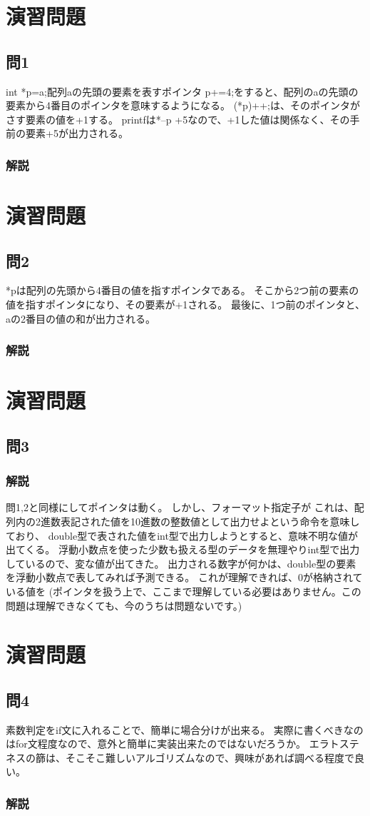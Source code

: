 \section{演習問題}
\subsection{問1}
int *p=a;配列aの先頭の要素を表すポインタ
p+=4;をすると、配列のaの先頭の要素から4番目のポインタを意味するようになる。
(*p)++;は、そのポインタがさす要素の値を+1する。
printfは*--p +5なので、+1した値は関係なく、その手前の要素+5が出力される。
\subsubsection{解説}

\section{演習問題}
\subsection{問2}
*pは配列の先頭から4番目の値を指すポインタである。
そこから2つ前の要素の値を指すポインタになり、その要素が+1される。
最後に、1つ前のポインタと、aの2番目の値の和が出力される。
\subsubsection{解説}

\section{演習問題}
\subsection{問3}
\subsubsection{解説}
問1,2と同様にしてポインタは動く。
しかし、フォーマット指定子が%
これは、配列内の2進数表記された値を10進数の整数値として出力せよという命令を意味しており、
double型で表された値をint型で出力しようとすると、意味不明な値が出てくる。
浮動小数点を使った少数も扱える型のデータを無理やりint型で出力しているので、変な値が出てきた。
出力される数字が何かは、double型の要素を浮動小数点で表してみれば予測できる。
これが理解できれば、0が格納されている値を%
(ポインタを扱う上で、ここまで理解している必要はありません。この問題は理解できなくても、今のうちは問題ないです。)

\section{演習問題}
\subsection{問4}
素数判定をif文に入れることで、簡単に場合分けが出来る。
実際に書くべきなのはfor文程度なので、意外と簡単に実装出来たのではないだろうか。
エラトステネスの篩は、そこそこ難しいアルゴリズムなので、興味があれば調べる程度で良い。
\subsubsection{解説}
